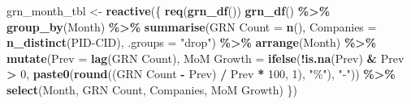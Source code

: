 \documentclass[
]{article}
\newenvironment{Shaded}{\begin{snugshade}}{\end{snugshade}}
\newcommand{\AttributeTok}[1]{\textcolor[rgb]{0.13,0.29,0.53}{#1}}
\newcommand{\DecValTok}[1]{\textcolor[rgb]{0.00,0.00,0.81}{#1}}
\newcommand{\FunctionTok}[1]{\textcolor[rgb]{0.13,0.29,0.53}{\textbf{#1}}}
\newcommand{\NormalTok}[1]{#1}
\newcommand{\OtherTok}[1]{\textcolor[rgb]{0.56,0.35,0.01}{#1}}
\newcommand{\SpecialCharTok}[1]{\textcolor[rgb]{0.81,0.36,0.00}{\textbf{#1}}}
\newcommand{\StringTok}[1]{\textcolor[rgb]{0.31,0.60,0.02}{#1}}
\begin{document}
\begin{Shaded}
\begin{Highlighting}[]
\NormalTok{    grn\_month\_tbl }\OtherTok{\textless{}{-}} \FunctionTok{reactive}\NormalTok{(\{}
      \FunctionTok{req}\NormalTok{(}\FunctionTok{grn\_df}\NormalTok{())}
      \FunctionTok{grn\_df}\NormalTok{() }\SpecialCharTok{\%\textgreater{}\%}
        \FunctionTok{group\_by}\NormalTok{(Month) }\SpecialCharTok{\%\textgreater{}\%}
        \FunctionTok{summarise}\NormalTok{(}\StringTok{\textasciigrave{}}\AttributeTok{GRN Count}\StringTok{\textasciigrave{}} \OtherTok{=} \FunctionTok{n}\NormalTok{(), }\AttributeTok{Companies =} \FunctionTok{n\_distinct}\NormalTok{(}\StringTok{\textasciigrave{}}\AttributeTok{PID{-}CID}\StringTok{\textasciigrave{}}\NormalTok{), }\AttributeTok{.groups =} \StringTok{"drop"}\NormalTok{) }\SpecialCharTok{\%\textgreater{}\%}
        \FunctionTok{arrange}\NormalTok{(Month) }\SpecialCharTok{\%\textgreater{}\%}
        \FunctionTok{mutate}\NormalTok{(}\AttributeTok{Prev =} \FunctionTok{lag}\NormalTok{(}\StringTok{\textasciigrave{}}\AttributeTok{GRN Count}\StringTok{\textasciigrave{}}\NormalTok{),}
               \StringTok{\textasciigrave{}}\AttributeTok{MoM Growth}\StringTok{\textasciigrave{}} \OtherTok{=} \FunctionTok{ifelse}\NormalTok{(}\SpecialCharTok{!}\FunctionTok{is.na}\NormalTok{(Prev) }\SpecialCharTok{\&}\NormalTok{ Prev }\SpecialCharTok{\textgreater{}} \DecValTok{0}\NormalTok{,}
                                     \FunctionTok{paste0}\NormalTok{(}\FunctionTok{round}\NormalTok{((}\StringTok{\textasciigrave{}}\AttributeTok{GRN Count}\StringTok{\textasciigrave{}} \SpecialCharTok{{-}}\NormalTok{ Prev) }\SpecialCharTok{/}\NormalTok{ Prev }\SpecialCharTok{*} \DecValTok{100}\NormalTok{, }\DecValTok{1}\NormalTok{), }\StringTok{"\%"}\NormalTok{), }\StringTok{"{-}"}\NormalTok{)) }\SpecialCharTok{\%\textgreater{}\%}
        \FunctionTok{select}\NormalTok{(Month, }\StringTok{\textasciigrave{}}\AttributeTok{GRN Count}\StringTok{\textasciigrave{}}\NormalTok{, Companies, }\StringTok{\textasciigrave{}}\AttributeTok{MoM Growth}\StringTok{\textasciigrave{}}\NormalTok{)}
\NormalTok{    \})}
    

\end{Highlighting}
\end{Shaded}
\end{document}
